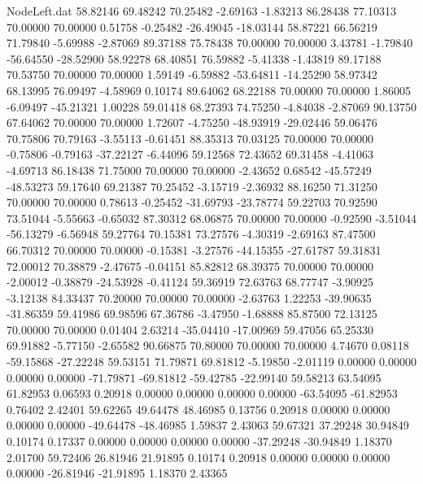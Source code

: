 \begin{filecontents}{NodeLeft.dat}
  58.82146   69.48242   70.25482    -2.69163   -1.83213   86.28438   77.10313   70.00000   70.00000    0.51758   -0.25482  -26.49045  -18.03144
  58.87221   66.56219   71.79840    -5.69988   -2.87069   89.37188   75.78438   70.00000   70.00000    3.43781   -1.79840  -56.64550  -28.52900
  58.92278   68.40851   76.59882    -5.41338   -1.43819   89.17188   70.53750   70.00000   70.00000    1.59149   -6.59882  -53.64811  -14.25290
  58.97342   68.13995   76.09497    -4.58969    0.10174   89.64062   68.22188   70.00000   70.00000    1.86005   -6.09497  -45.21321    1.00228
  59.01418   68.27393   74.75250    -4.84038   -2.87069   90.13750   67.64062   70.00000   70.00000    1.72607   -4.75250  -48.93919  -29.02446
  59.06476   70.75806   70.79163    -3.55113   -0.61451   88.35313   70.03125   70.00000   70.00000   -0.75806   -0.79163  -37.22127   -6.44096
  59.12568   72.43652   69.31458    -4.41063   -4.69713   86.18438   71.75000   70.00000   70.00000   -2.43652    0.68542  -45.57249  -48.53273
  59.17640   69.21387   70.25452    -3.15719   -2.36932   88.16250   71.31250   70.00000   70.00000    0.78613   -0.25452  -31.69793  -23.78774
  59.22703   70.92590   73.51044    -5.55663   -0.65032   87.30312   68.06875   70.00000   70.00000   -0.92590   -3.51044  -56.13279   -6.56948
  59.27764   70.15381   73.27576    -4.30319   -2.69163   87.47500   66.70312   70.00000   70.00000   -0.15381   -3.27576  -44.15355  -27.61787
  59.31831   72.00012   70.38879    -2.47675   -0.04151   85.82812   68.39375   70.00000   70.00000   -2.00012   -0.38879  -24.53928   -0.41124
  59.36919   72.63763   68.77747    -3.90925   -3.12138   84.33437   70.20000   70.00000   70.00000   -2.63763    1.22253  -39.90635  -31.86359
  59.41986   69.98596   67.36786    -3.47950   -1.68888   85.87500   72.13125   70.00000   70.00000    0.01404    2.63214  -35.04410  -17.00969
  59.47056   65.25330   69.91882    -5.77150   -2.65582   90.66875   70.80000   70.00000   70.00000    4.74670    0.08118  -59.15868  -27.22248
  59.53151   71.79871   69.81812    -5.19850   -2.01119    0.00000    0.00000    0.00000    0.00000  -71.79871  -69.81812  -59.42785  -22.99140
  59.58213   63.54095   61.82953     0.06593    0.20918    0.00000    0.00000    0.00000    0.00000  -63.54095  -61.82953    0.76402    2.42401
  59.62265   49.64478   48.46985     0.13756    0.20918    0.00000    0.00000    0.00000    0.00000  -49.64478  -48.46985    1.59837    2.43063
  59.67321   37.29248   30.94849     0.10174    0.17337    0.00000    0.00000    0.00000    0.00000  -37.29248  -30.94849    1.18370    2.01700
  59.72406   26.81946   21.91895     0.10174    0.20918    0.00000    0.00000    0.00000    0.00000  -26.81946  -21.91895    1.18370    2.43365

\end{filecontents}
